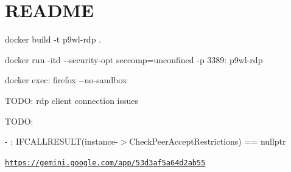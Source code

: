 \chapter{README }
\hypertarget{md__r_e_a_d_m_e}{}\label{md__r_e_a_d_m_e}

\begin{DoxyEnumerate}
\item {\ttfamily docker build -\/t p9wl-\/rdp .}
\item {\ttfamily docker run -\/itd -\/-\/security-\/opt seccomp=unconfined -\/p 3389: p9wl-\/rdp}
\item docker exec:\+ {\ttfamily firefox -\/-\/no-\/sandbox}
\item TODO:\+ rdp client connection issues
\end{DoxyEnumerate}

TODO:\+

\+[04:\+04:\+55:\+840]\+ \+[1:\+00000007]\+ \+[TRACE]\+\+ -\/ \+:\+ IFCALLRESULT(instance-\/\texorpdfstring{$>$}{>}Check\+Peer\+Accept\+Restrictions) == nullptr

\href{https://gemini.google.com/app/53d3af5a64d2ab55}{\texttt{https:\+/\+/\+gemini.\+google.\+com/\+app/\+53d3af5a64d2ab55}} 